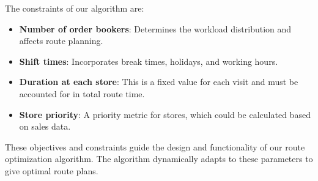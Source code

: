 The constraints of our algorithm are:
\begin{itemize}
    \item \textbf{Number of order bookers}: Determines the workload distribution and affects route planning.
    \item \textbf{Shift times}: Incorporates break times, holidays, and working hours.
    \item \textbf{Duration at each store}: This is a fixed value for each visit and must be accounted for in total route time.
    \item \textbf{Store priority}: A priority metric for stores, which could be calculated based on sales data.
\end{itemize}
These objectives and constraints guide the design and functionality of our route optimization algorithm. The algorithm dynamically adapts to these parameters to give optimal route plans.